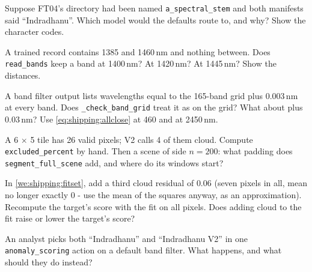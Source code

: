 \begin{checkyourself}
\item\label{ex:shipping:1} Suppose FT04's directory had been named \texttt{a\_spectral\_stem} and both manifests said
  ``Indradhanu''. Which model would the defaults route to, and why? Show the character codes.
\item\label{ex:shipping:2} A trained record contains 1385 and 1460\,nm and nothing between. Does \texttt{read\_bands} keep a
  band at 1400\,nm? At 1420\,nm? At 1445\,nm? Show the distances.
\item\label{ex:shipping:3} A band filter output lists wavelengths equal to the 165-band grid plus 0.003\,nm at every band.
  Does \texttt{\_check\_band\_grid} treat it as on the grid? What about plus 0.03\,nm? Use \eqref{eq:shipping:allclose} at
  460 and at 2450\,nm.
\item\label{ex:shipping:4} A 6 $\times$ 5 tile has 26 valid pixels; V2 calls 4 of them cloud. Compute
  \texttt{excluded\_percent} by hand. Then a scene of side $n = 200$: what padding does \texttt{segment\_full\_scene} add, and
  where do its windows start?
\item\label{ex:shipping:5} In \cref{we:shipping:fitset}, add a third cloud residual of $0.06$ (seven pixels in all, mean no
  longer exactly 0 - use the mean of the squares anyway, as an approximation). Recompute the target's score with the fit on
  all pixels. Does adding cloud to the fit raise or lower the target's score?
\item\label{ex:shipping:6} An analyst picks both ``Indradhanu'' and ``Indradhanu V2'' in one \texttt{anomaly\_scoring} action
  on a default band filter. What happens, and what should they do instead?
\end{checkyourself}
\endgroup

